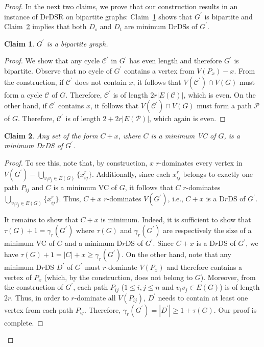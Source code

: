 \documentclass[a4paper]{article}
\theoremstyle{plain}
\newtheorem{claim}{Claim}[theorem]
\theoremstyle{definition}
\begin{document}
\begin{proof}
	In the next two claims, we prove that our construction results in an instance of \textsc{D$r$DSR} on bipartite graphs: Claim~\ref{clm:Gp-bipartite} shows that $G^\prime$ is bipartite and Claim~\ref{clm:Cx-DrDS} implies that both $D_s$ and $D_t$ are minimum D$r$DSs of $G^\prime$.
	\begin{claim}\label{clm:Gp-bipartite}
		$G^\prime$ is a bipartite graph.
	\end{claim}
	\begin{proof}
		We show that any cycle $\mathcal{C}^\prime$ in $G^\prime$ has even length and therefore $G^\prime$ is bipartite.
		Observe that no cycle of $G^\prime$ contains a vertex from $V(P_x) - x$.
		From the construction, if $\mathcal{C}^\prime$ does not contain $x$, it follows that $V(\mathcal{C}^\prime) \cap V(G)$ must form a cycle $\mathcal{C}$ of $G$.
		Therefore, $\mathcal{C}^\prime$ is of length $2r|E(\mathcal{C})|$, which is even.
		On the other hand, if $\mathcal{C^\prime}$ contains $x$, it follows that $V(\mathcal{C}^\prime) \cap V(G)$ must form a path $\mathcal{P}$ of $G$.
		Therefore, $\mathcal{C}^\prime$ is of length $2 + 2r|E(\mathcal{P})|$, which again is even.
	\end{proof}
	
	\begin{claim}\label{clm:Cx-DrDS}
		Any set of the form $C + x$, where $C$ is a minimum VC of $G$, is a minimum D$r$DS of $G^\prime$.
	\end{claim}
	\begin{proof}
		To see this, note that, by construction, $x$ $r$-dominates every vertex in $V(G^\prime) - \bigcup_{v_iv_j \in E(G)}\{x_{ij}^r\}$.
		Additionally, since each $x_{ij}^r$ belongs to exactly one path $P_{ij}$ and $C$ is a minimum VC of $G$, it follows that $C$ $r$-dominates $\bigcup_{v_iv_j \in E(G)}\{x_{ij}^r\}$.
		Thus, $C + x$ $r$-dominates $V(G^\prime)$, i.e., $C + x$ is a D$r$DS of $G^\prime$.
		
		It remains to show that $C + x$ is minimum.
		Indeed, it is sufficient to show that $\tau(G) + 1 = \gamma_r(G^\prime)$ where $\tau(G)$ and $\gamma_r(G^\prime)$ are respectively the size of a minimum VC of $G$ and a minimum D$r$DS of $G^\prime$.
		Since $C + x$ is a D$r$DS of $G^\prime$, we have $\tau(G) + 1 = |C| + x \geq  \gamma_r(G^\prime)$.
		On the other hand, note that any minimum D$r$DS $D^\prime$ of $G^\prime$ must $r$-dominate $V(P_x)$ and therefore contains a vertex of $P_x$ (which, by the construction, does not belong to $G$).
		Moreover, from the construction of $G^\prime$, each path $P_{ij}$ ($1 \leq i, j \leq n$ and $v_iv_j \in E(G)$) is of length $2r$.
		Thus, in order to $r$-dominate all $V(P_{ij})$, $D^\prime$ needs to contain at least one vertex from each path $P_{ij}$.
		Therefore, $\gamma_r(G^\prime) = |D^\prime| \geq 1 + \tau(G)$.
		Our proof is complete.
	\end{proof}
	

\end{proof}
\end{document}
